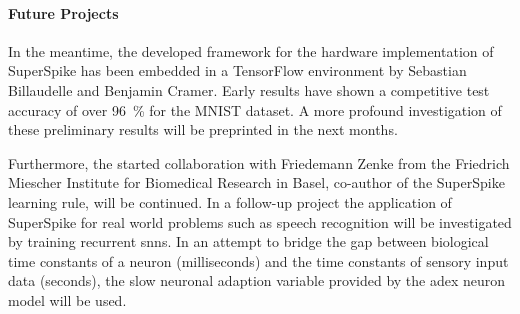 \paragraph{Future Projects} In the meantime, the developed framework for the hardware implementation of SuperSpike has been embedded in a TensorFlow environment by Sebastian Billaudelle and Benjamin Cramer. Early results have shown a competitive test accuracy of over \SI{96}{\%} for the MNIST dataset. A more profound investigation of these preliminary results will be preprinted in the next months.

Furthermore, the started collaboration with Friedemann Zenke from the Friedrich Miescher Institute for Biomedical Research in Basel, co-author of the SuperSpike learning rule, will be continued. In a follow-up project the application of SuperSpike for real world problems such as speech recognition will be investigated by training recurrent \glspl{snn}. In an attempt to bridge the gap between biological time constants of a neuron (milliseconds) and the time constants of sensory input data (seconds), the slow neuronal adaption variable provided by the \gls{adex} neuron model will be used.